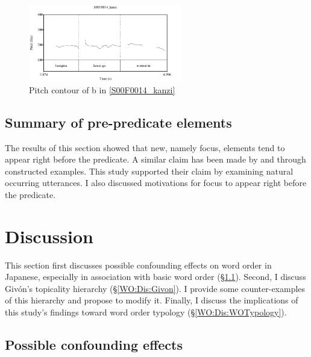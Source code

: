 \begin{figure}
	\begin{center}
	\includegraphics[width=0.6\textwidth]{sounds/S00F0014_kanzi.pdf}
	\caption{Pitch contour of b in \ref{S00F0014_kanzi}}
	\label{S00F0014_kanziF}
	\end{center}
\end{figure}

\subsection{Summary of pre-predicate elements}

The results of this section showed that
new, namely focus, elements tend to appear right before the predicate.
A similar claim has been made by  and 
through constructed examples.
This study supported their claim by examining natural occurring utterances.
I also discussed motivations for focus to appear right before the predicate.

\section{Discussion}\label{WODiscussion}

This section first discusses possible confounding effects on word order in Japanese,
especially in association with basic word order (\S \ref{WO:Dis:Confounding}).
Second,
I discuss Giv{\'{o}}n's topicality hierarchy (\S \ref{WO:Dis:Givon}).
I provide some counter-examples of this hierarchy and
propose to modify it.
Finally, 
I discuss the implications of this study's findings toward word order typology (\S \ref{WO:Dis:WOTypology}).



\subsection{Possible confounding effects}\label{WO:Dis:Confounding}

